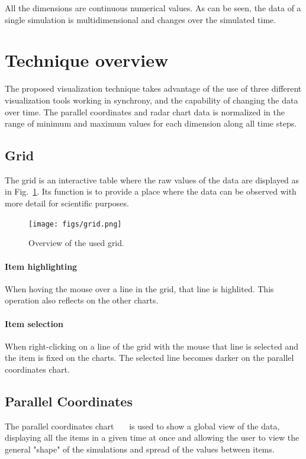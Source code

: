 \documentclass[10pt, conference]{IEEEtran}
\begin{document}
All the dimensions are continuous numerical values. As can be seen, the data of a single simulation is multidimensional and changes over the simulated time.

\section{Technique overview}
%

The proposed visualization technique takes advantage of the use of three different visualization tools working in synchrony, and the capability of changing the data over time. The parallel coordinates and radar chart data is normalized in the range of minimum and maximum values for each dimension along all time steps.

\subsection{Grid}

The grid is an interactive table where the raw values of the data are displayed as in Fig.~\ref{fig:grid}. Its function is to provide a place where the data can be observed with more detail for scientific purposes.

\begin{figure}
\texttt{[image: figs/grid.png]}
\caption{Overview of the used grid.} 
\label{fig:grid}
\end{figure}
\paragraph*{Item highlighting} When hoving the mouse over a line in the grid, that line is highlited. This operation also reflects on the other charts.
\paragraph*{Item selection} When right-clicking on a line of the grid with the mouse that line is selected and the item is fixed on the charts. The selected line becomes darker on the parallel coordinates chart.

\subsection{Parallel Coordinates}

The parallel coordinates chart~\cite{fanea2005interactive}~\cite{inselberg1990parallel}~\cite{inselberg1985plane} is used to show a global view of the data, displaying all the items in a given time at once and allowing the user to view the general "shape" of the simulations and spread of the values between items.
\end{document}
